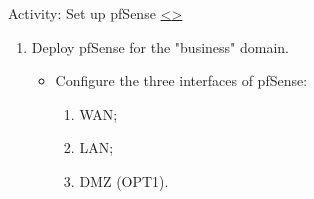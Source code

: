 \documentclass[12pt]{extarticle}
\newenvironment{instructionblock}{\Large\bgroup}{\egroup}
\begin{document}





\pagebreak
\begin{slide}{ Activity: Set up pfSense }{ \hyperref[slide 8]{\textless}\hyperref[slide 10]{\textgreater} }
\vskip 5pt
\begin{instructionblock}
\begin{enumerate}
\item Deploy pfSense for the "business" domain.
\begin{itemize}
    \item Configure the three interfaces of pfSense:
    \begin{enumerate}
        \item WAN;
        \item LAN;
        \item DMZ (OPT1).
    \end{enumerate}
    
\end{itemize}
\end{enumerate}
\end{instructionblock}
\end{slide}
\end{document}
